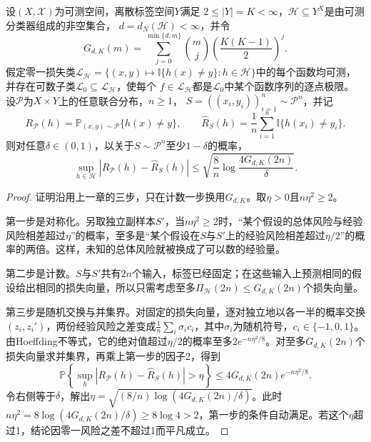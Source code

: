 \begingroup
{}
\begin{theorem}[有限标签的一致收敛保证]
\label{thm:finite-label-uniform-convergence}
设$(X,\mathcal X)$为可测空间，离散标签空间$Y$满足
$2\leq|Y|=K<\infty$，$\mathcal H\subseteq Y^X$是由可测分类器组成的非空集合，
$d=d_N(\mathcal H)<\infty$，并令
\[
 G_{d,K}(m)=\sum_{j=0}^{\min\{d,m\}}\binom mj
 \left(\frac{K(K-1)}2\right)^j.
\]
假定零一损失类$\mathcal L_{\mathcal H}
=\{(x,y)\mapsto\mathbb I\{h(x)\neq y\}:h\in\mathcal H\}$中的每个函数均可测，
并存在可数子类$\mathcal L_0\subseteq\mathcal L_{\mathcal H}$，使每个
$f\in\mathcal L_{\mathcal H}$都是$\mathcal L_0$中某个函数序列的逐点极限。
设$\mathcal P$为$X\times Y$上的任意联合分布，$n\geq1$，
$S=((x_i,y_i))_{i=1}^n\sim\mathcal P^n$，并记
\[
 R_{\mathcal P}(h)=\mathbb P_{(x,y)\sim\mathcal P}\{h(x)\neq y\},\qquad
 \hat R_S(h)=\frac1n\sum_{i=1}^n\mathbb I\{h(x_i)\neq y_i\}.
\]
则对任意$\delta\in(0,1)$，以关于$S\sim\mathcal P^n$至少$1-\delta$的概率，
\begin{equation}
 \sup_{h\in\mathcal H}|R_{\mathcal P}(h)-\hat R_S(h)|
 \leq\sqrt{\frac8n\log\frac{4G_{d,K}(2n)}{\delta}}.
 \label{eq:finite-label-uniform-bound}
\end{equation}
\end{theorem}
\endgroup

\begin{proof}
证明沿用上一章的三步，只在计数一步换用$G_{d,K}$。取$\eta>0$且$n\eta^2\geq2$。

第一步是对称化。另取独立副样本$S'$，当$n\eta^2\geq2$时，“某个假设的总体风险与经验风险相差超过$\eta$”的概率，至多是“某个假设在$S$与$S'$上的经验风险相差超过$\eta/2$”的概率的两倍。这样，未知的总体风险就被换成了可以数的经验量。

第二步是计数。$S$与$S'$共有$2n$个输入，标签已经固定；在这些输入上预测相同的假设给出相同的损失向量，所以只需考虑至多$\Pi_{\mathcal H}(2n)\leq G_{d,K}(2n)$个损失向量。

第三步是随机交换与并集界。对固定的损失向量，逐对独立地以各一半的概率交换$(z_i,z_i')$，两份经验风险之差变成$\frac1n\sum_i\sigma_ic_i$，其中$\sigma_i$为随机符号，$c_i\in\{-1,0,1\}$。由Hoeffding不等式，它的绝对值超过$\eta/2$的概率至多$2e^{-n\eta^2/8}$。对至多$G_{d,K}(2n)$个损失向量求并集界，再乘上第一步的因子2，得到
\[
 \mathbb P\!\left\{\sup_h|R_{\mathcal P}(h)-\hat R_S(h)|>\eta\right\}
 \leq4G_{d,K}(2n)e^{-n\eta^2/8}.
\]
令右侧等于$\delta$，解出$\eta=\sqrt{(8/n)\log(4G_{d,K}(2n)/\delta)}$。此时$n\eta^2=8\log(4G_{d,K}(2n)/\delta)\geq8\log4>2$，第一步的条件自动满足。若这个$\eta$超过1，结论因零一风险之差不超过1而平凡成立。
\end{proof}

